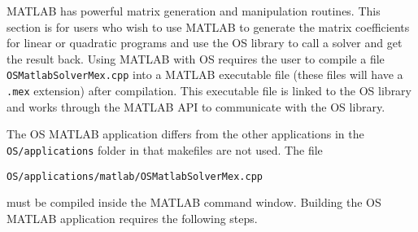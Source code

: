 
\ifruncode\else    %

\label{section:usingmatlab}

MATLAB has powerful matrix generation and manipulation routines. This section is for users who wish to use MATLAB to generate the matrix coefficients for linear or quadratic programs and use the OS library to call a solver and get the result back. Using MATLAB with OS requires the user to compile a file {\tt OSMatlabSolverMex.cpp} into a MATLAB executable file (these files will have a {\tt .mex} extension) after compilation. This executable file is linked to the OS library and works through the MATLAB API to communicate with the OS library. 



The OS MATLAB application differs from the other applications in the {\tt OS/applications} folder in that makefiles are not used.  The file 
\begin{verbatim}
OS/applications/matlab/OSMatlabSolverMex.cpp
\end{verbatim}
must be compiled inside the MATLAB command window.  Building the OS MATLAB application requires the following steps. 



